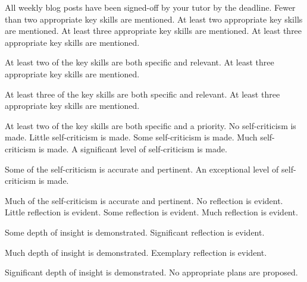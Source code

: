 \documentclass{../fal_assignment}
\begin{document}
\begin{markingrubric}
%
        \grade 		All weekly blog posts have been signed-off by your tutor by the deadline.
%
        \grade\fail 	Fewer than two appropriate key skills are mentioned.
        \grade 		At least two appropriate key skills are mentioned.
        \grade 		At least three appropriate key skills are mentioned.
        \grade 		At least three appropriate key skills are mentioned.
        \par 		At least two of the key skills are both specific and relevant.
        \grade 		At least three appropriate key skills are mentioned.
        \par 		At least three of the key skills are both specific and relevant.
        \grade 		At least three appropriate key skills are mentioned.
        \par 		At least two of the key skills are both specific and a priority.
%
        \grade\fail 	No self-criticism is made.
        \grade 		Little self-criticism is made.
        \grade 		Some self-criticism is made.
        \grade 		Much self-criticism is made.
        \grade 		A significant level of self-criticism is made.
            \par 		Some of the self-criticism is accurate and pertinent.
        \grade 		An exceptional level of self-criticism is made.
            \par 		Much of the self-criticism is accurate and pertinent.
%
        \grade\fail 	No reflection is evident.
        \grade 		Little reflection is evident.
        \grade 		Some reflection is evident.
        \grade 		Much reflection is evident.
        \par 		Some depth of insight is demonstrated.
        \grade 		Significant reflection is evident.
        \par 		Much depth of insight is demonstrated.
        \grade 		Exemplary reflection is evident.
        \par 		Significant depth of insight is demonstrated.
%
        \grade\fail 	No appropriate plans are proposed.

\end{markingrubric}
\end{document}
